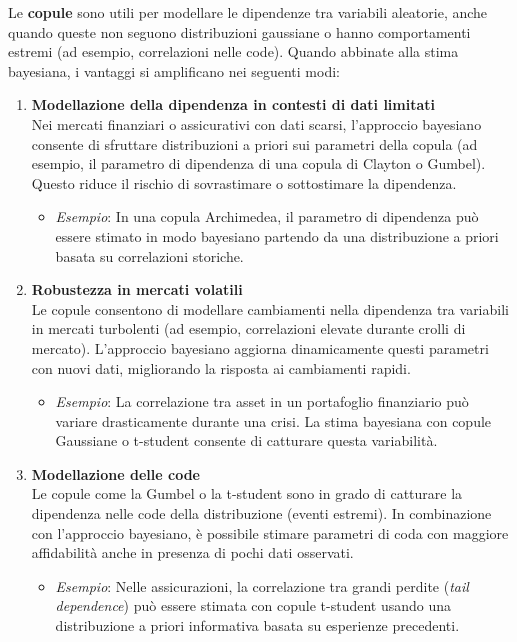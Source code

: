 \documentclass[a4paper,12pt]{article}
\begin{document}
\begin{itemize}
	Le \textbf{copule} sono utili per modellare le dipendenze tra variabili aleatorie, anche quando queste non seguono distribuzioni gaussiane o hanno comportamenti estremi (ad esempio, correlazioni nelle code). Quando abbinate alla stima bayesiana, i vantaggi si amplificano nei seguenti modi:
	
	\begin{enumerate}
		\item \textbf{Modellazione della dipendenza in contesti di dati limitati} \\
		Nei mercati finanziari o assicurativi con dati scarsi, l'approccio bayesiano consente di sfruttare distribuzioni a priori sui parametri della copula (ad esempio, il parametro di dipendenza di una copula di Clayton o Gumbel). Questo riduce il rischio di sovrastimare o sottostimare la dipendenza.
		\begin{itemize}
			\item \textit{Esempio}: In una copula Archimedea, il parametro di dipendenza può essere stimato in modo bayesiano partendo da una distribuzione a priori basata su correlazioni storiche.
		\end{itemize}
		
		\item \textbf{Robustezza in mercati volatili} \\
		Le copule consentono di modellare cambiamenti nella dipendenza tra variabili in mercati turbolenti (ad esempio, correlazioni elevate durante crolli di mercato). L'approccio bayesiano aggiorna dinamicamente questi parametri con nuovi dati, migliorando la risposta ai cambiamenti rapidi.
		\begin{itemize}
			\item \textit{Esempio}: La correlazione tra asset in un portafoglio finanziario può variare drasticamente durante una crisi. La stima bayesiana con copule Gaussiane o t-student consente di catturare questa variabilità.
		\end{itemize}
		
		\item \textbf{Modellazione delle code} \\
		Le copule come la Gumbel o la t-student sono in grado di catturare la dipendenza nelle code della distribuzione (eventi estremi). In combinazione con l'approccio bayesiano, è possibile stimare parametri di coda con maggiore affidabilità anche in presenza di pochi dati osservati.
		\begin{itemize}
			\item \textit{Esempio}: Nelle assicurazioni, la correlazione tra grandi perdite (\textit{tail dependence}) può essere stimata con copule t-student usando una distribuzione a priori informativa basata su esperienze precedenti.
		\end{itemize}
		

\end{enumerate}
\end{itemize}
\end{document}
